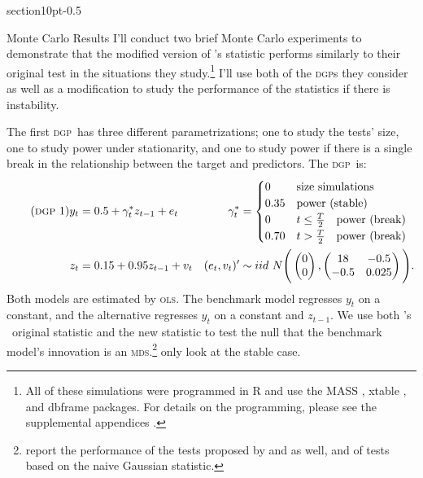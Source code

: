 \documentclass[10pt,fleqn,draft]{article}
\makeatletter
\newcommand\citepos[2][]{\citeauthor{#2}'s \citeyearpar[#1]{#2}}
\newcommand\poscw{\citeauthor{ClW:06}'s \citeyearpar{ClW:06,ClW:07}}
\renewcommand\section{\@startsection%
{section}{1}{0pt}{-\baselineskip}{0.5\baselineskip}%
{\normalfont\normalsize\bfseries\large\raggedright}}
\theoremstyle{definition}
\newcommand{\dgp}{\textsc{dgp}}
\newcommand{\mds}{\textsc{mds}}
\newcommand{\ols}{\textsc{ols}}
\makeatother
\begin{document}
\section{Monte Carlo Results}\label{sec:2}
I'll conduct two brief Monte Carlo experiments to demonstrate that the
modified version of \citepos{ClW:07} statistic performs similarly to
their original test in the situations they study.\footnote{All of
  these simulations were programmed in R \citep[version 2.14.0]{R} and
  use the \textsc{MASS} \citep[version info]{VeR:02}, xtable
  \citep[version info]{Dah:09}, and dbframe \citep[version
  0.2.1]{Cal:10b} packages.  For details on the programming, please
  see the supplemental appendices \citep{Cal:11f,Cal:11g,Cal:11h}.}
I'll use both of the \dgp s they consider as well as a modification to
study the performance of the statistics if there is instability.

The first \dgp\ has three different parametrizations; one to study the
tests' size, one to study power under stationarity, and one to study
power if there is a single break in the relationship between the
target and predictors.  The \dgp\ is:
\begin{align}\label{eq:dgp1}\tag{\dgp\ 1}
  y_t &= 0.5 + \gamma^{*}_t z_{t-1} + e_t &
  \gamma^{*}_t &=
  \begin{cases}
    0    & \text{size simulations} \\
    0.35 & \text{power (stable)} \\
    0    & t \leq \tfrac{T}{2} \quad \text{power (break)} \\
    0.70 & t > \tfrac{T}{2} \quad \text{power (break)}
  \end{cases}\\\nonumber
  z_t &= 0.15 + 0.95 z_{t-1} + v_t &
  (e_t, v_t)' &\sim iid\ N\Bigg(\begin{pmatrix} 0 \\ 0
  \end{pmatrix}
   , \begin{pmatrix} 18 & -
    0.5 \\ -0.5 & 0.025 \end{pmatrix}\Bigg).
\end{align}
Both models are estimated by \ols. The benchmark model regresses $y_t$
on a constant, and the alternative regresses $y_t$ on a constant and
$z_{t-1}$.  We use both \poscw\ original statistic and the new
statistic to test the null that the benchmark model's innovation is an
\mds.\footnote{\citet{ClW:07} report the performance of the tests
  proposed by \citet{CCS:01} and \citet{ClM:05} as well, and of tests
  based on the naive Gaussian statistic.}  \citet{ClW:06,ClW:07} only
look at the stable case.
\end{document}
